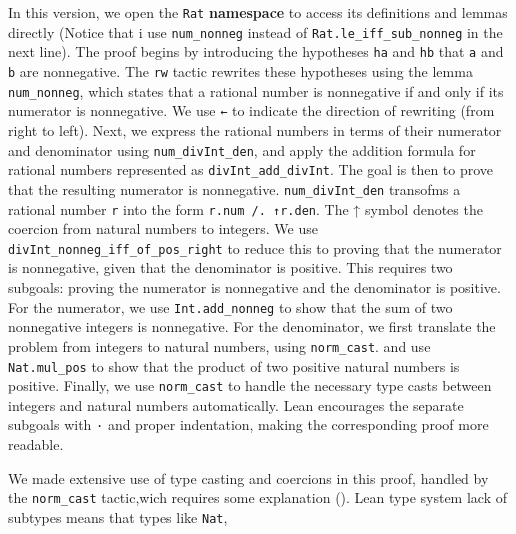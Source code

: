 \begin{example}
\begin{lstlisting}[language=lean]
\end{lstlisting}
In this version, we open the 
\lstinline[language=lean]|Rat| \textbf{namespace} to access its definitions and lemmas directly (Notice that i use \lstinline[language=lean]|num_nonneg| instead of 
\lstinline[language=lean]|Rat.le_iff_sub_nonneg| in the next line).
The proof begins by introducing the hypotheses \lstinline[language=lean]|ha| and \lstinline[language=lean]|hb|
that \lstinline[language=lean]|a| and \lstinline[language=lean]|b| are nonnegative.
The \lstinline[language=lean]|rw| tactic rewrites these hypotheses using the lemma
\lstinline[language=lean]|num_nonneg|, which states that a rational number
is nonnegative if and only if its numerator is nonnegative. 
We use \lstinline[language=lean]|←| to indicate the direction of rewriting (from right to left).
Next, we express the rational numbers in terms of their numerator and denominator using
\lstinline[language=lean]|num_divInt_den|, and apply the addition formula
for rational numbers represented as \lstinline[language=lean]|divInt_add_divInt|.
The goal is then to prove that the resulting numerator is nonnegative.
\lstinline[language=lean]|num_divInt_den| transofms a rational number \lstinline[language=lean]|r| 
into the form \lstinline[language=lean]|r.num /. ↑r.den|. The ↑ symbol denotes
the coercion from natural numbers to integers. 
We use \lstinline[language=lean]|divInt_nonneg_iff_of_pos_right| to reduce this to proving that the 
numerator is nonnegative, given that the denominator is positive.
This requires two subgoals: proving the numerator is nonnegative and the denominator is positive.
For the numerator, we use \lstinline[language=lean]|Int.add_nonneg|
to show that the sum of two nonnegative integers is nonnegative.
For the denominator, we first translate the problem from integers to natural numbers, using \lstinline[language=lean]|norm_cast|.
and use \lstinline[language=lean]|Nat.mul_pos| to show that the product of two positive natural numbers is positive.
Finally, we use \lstinline[language=lean]|norm_cast| to handle the necessary type casts between integers 
and natural numbers automatically.
Lean encourages the separate subgoals with \lstinline[language=lean]|·| and proper indentation, 
making the corresponding proof more readable.
\end{example}
We made extensive use of type casting and coercions in this proof, handled by 
the \lstinline[language=lean]|norm_cast| tactic,wich requires some explanation (\cite{lewis_madelaine_simplifying_casts_coercions_2020}).
Lean type system lack of subtypes means that types like \lstinline[language=lean]|Nat|, 

